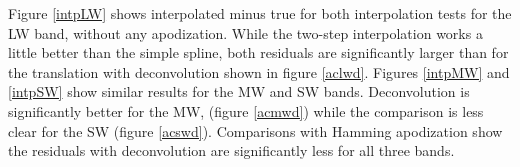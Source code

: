 \documentclass[12pt]{article}
\begin{document}
Figure \ref{intpLW} shows interpolated {\cris} minus true {\cris}
for both interpolation tests for the LW band, without any
apodization.  While the two-step interpolation works a little better
than the simple spline, both residuals are significantly larger than
for the translation with deconvolution shown in figure \ref{aclwd}.
Figures \ref{intpMW} and \ref{intpSW} show similar results for the
MW and SW bands.  Deconvolution is significantly better for the MW,
(figure \ref{acmwd}) while the comparison is less clear for the SW
(figure \ref{acswd}).  Comparisons with Hamming apodization show the
residuals with deconvolution are significantly less for all three
bands.

% 
% 
%   
% 
% 
% 
\end{document}
